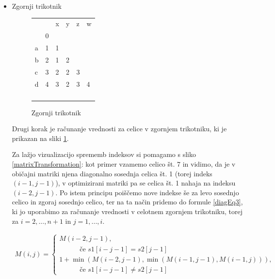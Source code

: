 \documentclass[a4paper,12pt,openright]{book}
\begin{document}
\begin{itemize}
    \item Zgornji trikotnik
    
\begin{figure}[htb]
\centering
\begin{tabular}{|l|l|l|l|l|l|}
\cline{3-6}
\multicolumn{2}{c|}{}  & x & y & z & w \\ \cline{2-6}
\multicolumn{1}{c|}{} & 0 & \multicolumn{4}{c}{} \\ \cline{1-3}
a  & 1 & 1 &  \multicolumn{3}{c}{} \\ \cline{1-4}
b  & 2 & \cellcolor{blue!15}1 & 2 & \multicolumn{2}{c}{} \\ \cline{1-5}
c  & 3 & \cellcolor{blue!15}2 & \cellcolor{blue!15}2 & 3 & \multicolumn{1}{c}{} \\ \cline{1-6}
d  & 4 & \cellcolor{blue!15}3 & \cellcolor{blue!15}2 & \cellcolor{blue!15}3 & 4 \\ \hline
 \multicolumn{1}{c|}{} & & & & & \multicolumn{1}{c}{} \\ \cline{2-5}
\multicolumn{1}{c|}{} & & & & \multicolumn{2}{c}{} \\ \cline{2-4}
\multicolumn{1}{c|}{} & & & \multicolumn{3}{c}{} \\ \cline{2-3}
\multicolumn{1}{c|}{} & & \multicolumn{4}{c}{} \\ \cline{2-2}
\end{tabular}
\caption{Zgornji trikotnik}
\label{diagMemory2}
\end{figure}

Drugi korak je računanje vrednosti za celice v zgornjem trikotniku, ki je prikazan na sliki \ref{diagMemory2}. 

Za lažjo vizualizacijo sprememb indeksov si pomagamo s sliko \ref{matrixTransformation}: kot primer vzamemo celico št. 7 in vidimo, da je v običajni matriki njena diagonalno sosednja celica št. 1 (torej indeks $(i-1, j-1)$), v optimizirani matriki pa se celica št. 1 nahaja na indeksu $(i-2, j-1)$. Po istem principu poiščemo nove indekse še za levo sosednjo celico in zgoraj sosednjo celico, ter na ta način pridemo do formule \ref{diagEq3}, ki jo uporabimo za računanje vrednosti v celotnem zgornjem trikotniku, torej za $i=2,...,n+1$ in $j=1,...,i$. 
        
\begin{equation}
\label{diagEq3}
\begin{aligned}
M(i, j) =
\begin{cases}
     M(i-2, j-1) ,     \\ \quad \quad \quad \text{če } s1[i-j-1]=s2[j-1]\\
     1 + \min(M(i-2, j-1), \min(M(i-1, j-1), M(i-1, j))) , \\ \quad \quad \quad \text{če } s1[i-j-1] \neq s2[j-1]
  \end{cases}
\end{aligned}
\end{equation}


\end{itemize}
\end{document}
